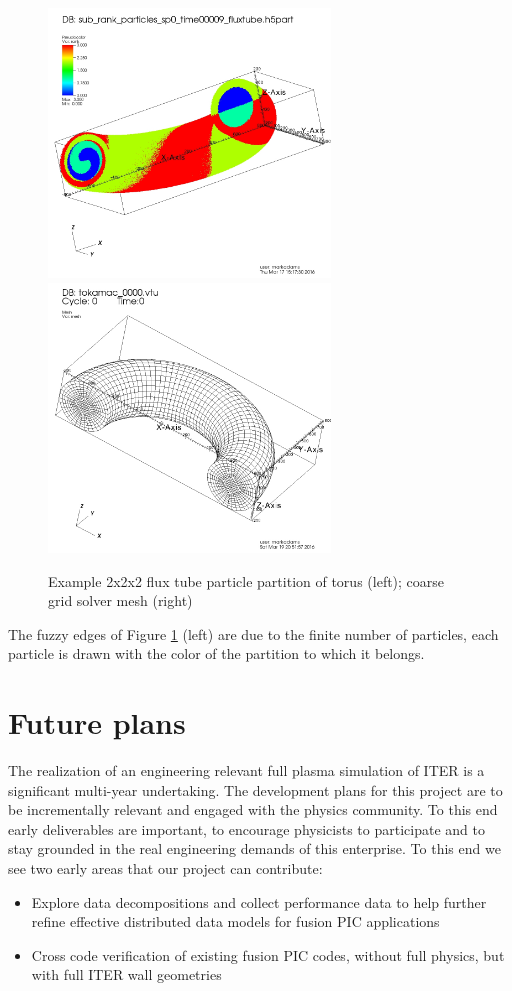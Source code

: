 \documentclass[review]{siamart}
\begin{document}
\begin{figure}[h!]
   \centering
   \includegraphics[width=75mm]{half_grid.jpeg} 
    \includegraphics[width=75mm]{half_grid_mesh.jpeg} 
   \caption{Example 2x2x2 flux tube particle partition of torus (left); coarse grid solver mesh (right)}
   \label{fig:cross}
\end{figure}

The fuzzy edges of Figure \ref{fig:cross} (left) are due to the finite number of particles, each particle is drawn with the color of the partition to which it belongs.

\section{Future plans}

The realization of an engineering relevant full plasma simulation of ITER is a significant multi-year undertaking.
The development plans for this project are to be incrementally relevant and engaged with the physics community.
To this end early deliverables are important, to encourage physicists to participate and to stay grounded in the real engineering demands of this enterprise.
To this end we see two early areas that our project can contribute:
\begin{itemize}
\item Explore data decompositions and collect performance data to help further refine effective distributed data models for fusion PIC applications
\item Cross code verification of existing fusion PIC codes, without full physics, but with full ITER wall geometries
\end{itemize}
 




 
\end{document}
